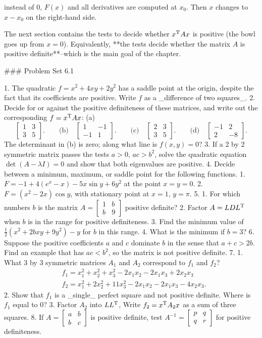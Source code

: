 instead of \(0\), \(F(x)\) and all derivatives are computed at \(x_{0}\). Then \(x\) changes to \(x-x_{0}\) on the right-hand side.

The next section contains the tests to decide whether \(x^{\rm T}Ax\) is positive (the bowl goes up from \(x=0\)). Equivalently, **the tests decide whether the matrix \(A\) is positive definite**--which is the main goal of the chapter.

### Problem Set 6.1

1. The quadratic \(f=x^{2}+4xy+2y^{2}\) has a saddle point at the origin, despite the fact that its coefficients are positive. Write \(f\) as a _difference of two squares_.
2. Decide for or against the positive definiteness of these matrices, and write out the corresponding \(f=x^{\rm T}Ax\): (a) \[\begin{bmatrix}1&3\\ 3&5\end{bmatrix}.\qquad\text{(b)}\quad\begin{bmatrix}1&-1\\ -1&1\end{bmatrix}.\qquad\text{(c)}\quad\begin{bmatrix}2&3\\ 3&5\end{bmatrix}.\qquad\text{(d)}\quad\begin{bmatrix}-1&2\\ 2&-8\end{bmatrix}.\] The determinant in (b) is zero; along what line is \(f(x,y)=0\)?
3. If a 2 by 2 symmetric matrix passes the tests \(a>0\), \(ac>b^{2}\), solve the quadratic equation \(\det(A-\lambda I)=0\) and show that both eigenvalues are positive.
4. Decide between a minimum, maximum, or saddle point for the following functions. 1. \(F=-1+4(e^{x}-x)-5x\sin y+6y^{2}\) at the point \(x=y=0\). 2. \(F=(x^{2}-2x)\cos y\), with stationary point at \(x=1\), \(y=\pi\).
5. 1. For which numbers \(b\) is the matrix \(A=\left[\begin{smallmatrix}1&b\\ b&9\end{smallmatrix}\right]\) positive definite? 2. Factor \(A=LDL^{\rm T}\) when \(b\) is in the range for positive definiteness. 3. Find the minimum value of \(\frac{1}{2}(x^{2}+2bxy+9y^{2})-y\) for \(b\) in this range. 4. What is the minimum if \(b=3\)?
6. Suppose the positive coefficients \(a\) and \(c\) dominate \(b\) in the sense that \(a+c>2b\). Find an example that has \(ac<b^{2}\), so the matrix is not positive definite.
7. 1. What 3 by 3 symmetric matrices \(A_{1}\) and \(A_{2}\) correspond to \(f_{1}\) and \(f_{2}\)? \[\begin{split}& f_{1}=x_{1}^{2}+x_{2}^{2}+x_{3}^{2}-2x_{1}x_{2}-2x_{1 }x_{3}+2x_{2}x_{3}\\ & f_{2}=x_{1}^{2}+2x_{2}^{2}+11x_{3}^{2}-2x_{1}x_{2}-2x_{1}x_{3}-4x _{2}x_{3}.\end{split}\] 2. Show that \(f_{1}\) is a _single_ perfect square and not positive definite. Where is \(f_{1}\) equal to 0? 3. Factor \(A_{2}\) into \(LL^{\rm T}\), Write \(f_{2}=x^{\rm T}A_{2}x\) as a sum of three squares.
8. If \(A=\left[\begin{smallmatrix}a&b\\ b&c\end{smallmatrix}\right]\) is positive definite, test \(A^{-1}=\left[\begin{smallmatrix}p&q\\ q&r\end{smallmatrix}\right]\) for positive definiteness.

 
